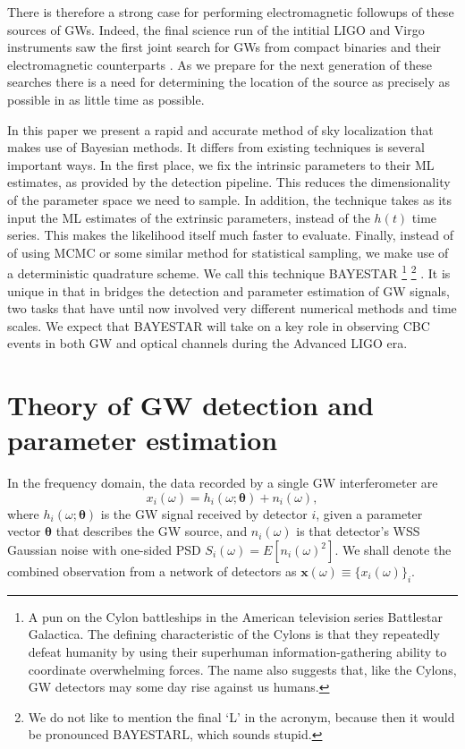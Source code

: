 \documentclass{iopart}
\begin{document}
There is therefore a strong case for performing electromagnetic followups of these sources of \acp{GW}. Indeed, the final science run of the intitial LIGO and Virgo instruments saw the first joint search for \acp{GW} from compact binaries and their electromagnetic counterparts \cite{abadie2012first}.  As we prepare for the next generation of these searches there is a need for determining the location of the source as precisely as possible in as little time as possible.

In this paper we present a rapid and accurate method of sky localization that makes use of Bayesian methods. It differs from existing techniques is several important ways.  In the first place, we fix the intrinsic parameters to their \ac{ML} estimates, as provided by the detection pipeline.  This reduces the dimensionality of the parameter space we need to sample. In addition, the technique takes as its input the \ac{ML} estimates of the extrinsic parameters, instead of the $h(t)$ time series. This makes the likelihood itself much faster to evaluate. Finally, instead of of using \ac{MCMC} or some similar method for statistical sampling, we make use of a deterministic quadrature scheme. We call this technique \ac{BAYESTAR}%
%
\footnote{A pun on the Cylon battleships in the American television series Battlestar Galactica. The defining characteristic of the Cylons is that they repeatedly defeat humanity by using their superhuman information\nobreakdashes-gathering ability to coordinate overwhelming forces. The name also suggests that, like the Cylons, \ac{GW} detectors may some day rise against us humans.}%
%
\footnote{We do not like to mention the final `L' in the acronym, because then it would be pronounced BAYESTARL, which sounds stupid.}%
. It is unique in that in bridges the detection and parameter estimation of \ac{GW} signals, two tasks that have until now involved very different numerical methods and time scales. We expect that \ac{BAYESTAR} will take on a key role in observing \ac{CBC} events in both \ac{GW} and optical channels during the Advanced \ac{LIGO} era.

\section{Theory of \ac{GW} detection and parameter estimation}

In the frequency domain, the data recorded by a single \ac{GW} interferometer are
%
\begin{equation}\label{eq:signal-model}
	x_i (\omega) = h_i (\omega; \boldsymbol\theta) + n_i (\omega),
\end{equation}
%
where $h_i (\omega; \boldsymbol\theta)$ is the \ac{GW} signal received by detector $i$, given a parameter vector $\boldsymbol\theta$ that describes the \ac{GW} source, and $n_i (\omega)$ is that detector's \ac{WSS} Gaussian noise with one\nobreakdashes-sided \ac{PSD} $S_i(\omega) = E\left[n_i(\omega)^2\right]$. We shall denote the combined observation from a network of detectors as $\mathbf x (\omega) \equiv \{x_i (\omega)\}_i$.
\end{document}
